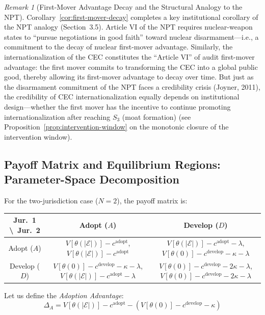 \documentclass[12pt,a4paper]{article}
\theoremstyle{definition}
\theoremstyle{remark}
\newtheorem{remark}{Remark}[section]
\begin{document}
\begin{remark}[First-Mover Advantage Decay and the Structural Analogy to the NPT]
Corollary~\ref{cor:first-mover-decay} completes a key institutional corollary of the NPT analogy (Section~3.5). Article VI of the NPT requires nuclear-weapon states to ``pursue negotiations in good faith'' toward nuclear disarmament—i.e., a commitment to the decay of nuclear first-mover advantage. Similarly, the internationalization of the CEC constitutes the ``Article VI'' of audit first-mover advantage: the first mover commits to transforming the CEC into a global public good, thereby allowing its first-mover advantage to decay over time. But just as the disarmament commitment of the NPT faces a credibility crisis (Joyner, 2011), the credibility of CEC internationalization equally depends on institutional design—whether the first mover has the incentive to continue promoting internationalization after reaching $S_3$ (moat formation) (see Proposition~\ref{prop:intervention-window} on the monotonic closure of the intervention window).
\end{remark}

\subsection{Payoff Matrix and Equilibrium Regions: Parameter-Space Decomposition}

For the two-jurisdiction case ($N=2$), the payoff matrix is:

\begin{table}[htbp]
\centering
\begin{tabular}{@{}c|cc@{}}
\toprule
Jur.\ 1 \textbackslash\ Jur.\ 2 & Adopt ($A$) & Develop ($D$) \\
\midrule
Adopt ($A$) & $V[\theta(|\mathcal{E}|)] - c^{\text{adopt}}$, $V[\theta(|\mathcal{E}|)] - c^{\text{adopt}}$ & $V[\theta(|\mathcal{E}|)] - c^{\text{adopt}} - \lambda$, $V[\theta(0)] - c^{\text{develop}} - \kappa - \lambda$ \\[4pt]
Develop ($D$) & $V[\theta(0)] - c^{\text{develop}} - \kappa - \lambda$, $V[\theta(|\mathcal{E}|)] - c^{\text{adopt}} - \lambda$ & $V[\theta(0)] - c^{\text{develop}} - 2\kappa - \lambda$, $V[\theta(0)] - c^{\text{develop}} - 2\kappa - \lambda$ \\
\bottomrule
\end{tabular}
\end{table}

Let us define the \textit{Adoption Advantage}:
\begin{equation}
\Delta_A = V[\theta(|\mathcal{E}|)] - c^{\text{adopt}} - \left( V[\theta(0)] - c^{\text{develop}} - \kappa \right)
\end{equation}
\end{document}
